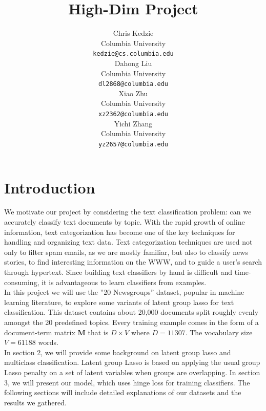 \documentclass[11pt]{article}
\title{High-Dim Project}
\author{Chris Kedzie \\
  Columbia University\\
  {\small \tt kedzie@cs.columbia.edu} \\\And
  Dahong Liu \\
  Columbia University\\
  {\small \tt dl2868@columbia.edu} \\\And
  Xiao Zhu\\
  Columbia University\\
  {\small \tt xz2362@columbia.edu} \\\And
  Yichi Zhang\\
  Columbia University\\
  {\small \tt yz2657@columbia.edu} \\}
\date{}
\begin{document}
\maketitle

\section{Introduction}
We motivate our project by considering the text classification problem: 
can we accurately classify text documents by topic. With the rapid growth 
of online information, text categorization has become one of the key techniques 
for handling and organizing text data. Text categorization techniques are used 
not only to filter spam emails, as we are mostly familiar, but also to classify 
news stories, to find interesting information on the WWW, and to guide a 
user's search through hypertext. Since building text classifiers by hand is 
difficult and time-consuming, it is advantageous to learn classifiers from examples. \\

In this project we will use the ''20 Newsgroups'' dataset, popular in machine 
learning literature, to explore some variants of latent group lasso for text classification. 
This dataset contains about 20,000 documents split roughly evenly amongst the 20 
predefined topics. Every training example comes in the form of a document-term 
matrix $\mathbf{M}$ that is $D\times V$ where $D=11307$. The vocabulary 
size $V= 61188$ words. \\

In section 2, we will provide some background on latent group lasso and 
multiclass classification. Latent group Lasso is based on applying the usual 
group Lasso penalty on a set of latent variables when groups are overlapping.
In section 3, we will present our model, which uses hinge loss for training classifiers. 
The following sections will include detailed explanations of our datasets and the 
results we gathered.
\end{document}
